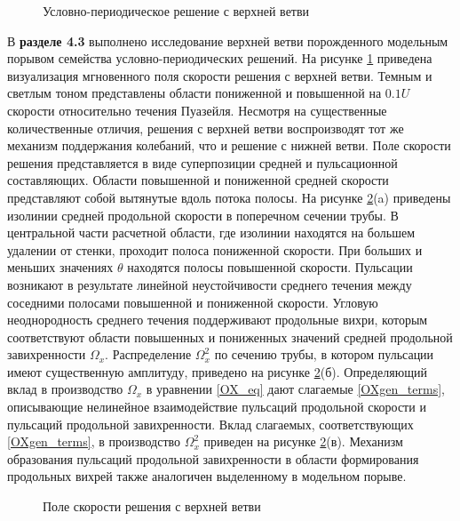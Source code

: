 \begin{figure}
\caption{Условно-периодическое решение с верхней ветви}
\label{3D_ub_pic}
\end{figure} 

В \textbf{разделе 4.3} выполнено исследование верхней ветви порожденного модельным порывом семейства условно-периодических решений. На рисунке \ref{3D_ub_pic} приведена визуализация мгновенного поля скорости решения с верхней ветви. Темным и светлым тоном представлены области пониженной и повышенной на $0.1U$ скорости относительно течения Пуазейля. Несмотря на существенные количественные отличия, решения с верхней ветви воспроизводят тот же механизм поддержания колебаний, что и решение с нижней ветви. Поле скорости решения представляется в виде суперпозиции средней и пульсационной составляющих. Области повышенной и пониженной средней скорости представляют собой вытянутые вдоль потока полосы. На рисунке \ref{ub_cs_pic}(a) приведены изолинии средней продольной скорости в поперечном сечении трубы. В центральной части расчетной области, где изолинии находятся на большем удалении от стенки, проходит полоса пониженной скорости. При больших и меньших значениях $\theta$ находятся полосы повышенной скорости. Пульсации возникают в результате линейной неустойчивости среднего течения между соседними полосами повышенной и пониженной скорости. Угловую неоднородность среднего течения поддерживают продольные вихри, которым соответствуют области повышенных и пониженных значений средней продольной завихренности $\Omega_x$. Распределение $\Omega^2_x$ по сечению трубы, в котором пульсации имеют существенную амплитуду, приведено на рисунке \ref{ub_cs_pic}(б). Определяющий вклад в производство $\Omega_x$ в уравнении \eqref{OX_eq} дают слагаемые \eqref{OXgen_terms}, описывающие нелинейное взаимодействие пульсаций продольной скорости и пульсаций продольной завихренности. Вклад слагаемых, соответствующих \eqref{OXgen_terms}, в производство $\Omega^2_x$ приведен на рисунке \ref{ub_cs_pic}(в). Механизм образования пульсаций продольной завихренности в области формирования продольных вихрей также аналогичен выделенному в модельном порыве. 


\begin{figure}
\caption{Поле скорости решения с верхней ветви}
\label{ub_cs_pic}
\end{figure} 



